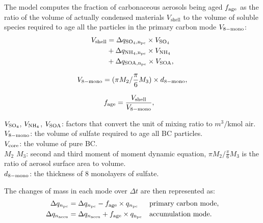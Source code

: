 \documentclass[12pt, fullpage]{uiucthesis2009}
\begin{document}
	The model computes the fraction of carbonaceous aerosols being aged $f_{\rm{age}}$ as the ratio of the volume of actually condensed materials $V_\text{shell}$ to the volume of soluble species required to age all the particles in the primary carbon mode $V_{\rm{8-mono}}$:
	\begin{align}
	\begin{split}
	V_{\rm{shell}} &=  \Delta q_{\rm{SO_4}, n_{\rm{pc}}} \times V_{\rm{SO_4}} \\
	&+ \Delta q_{\rm{NH_4}, n_{\rm{pc}}} \times V_{\rm{NH_4}} \\
	&+ \Delta q_{\rm{SOA}, n_{\rm{pc}}} \times V_{\rm{SOA}}, 
	\end{split}
	\end{align}
	
	\begin{align}
	\begin{split}
	V_{\rm{8-mono}} = (\pi M_2/ \frac{\pi}{6}M_3) \times d_{\rm{8-mono}},
	\end{split}
	\end{align}
	
	\begin{align}
	f_{\rm{age}} &= \frac{V_{\rm{shell}}}{V_{\rm{8-mono}}},  
	\end{align}
	
	\begin{flushleft}
		$V_{\rm{SO_4}}$, $V_{\rm{NH_4}}$, $V_{\rm{SOA}}$: factors that convert the unit of mixing ratio to $m^3/$kmol air. \\
		$V_{\rm{8-mono}}$: the volume of sulfate required to age all BC particles. \\
		$V_{\rm{core}}$: the volume of pure BC. \\
		$M_2$ $M_3$: second and third moment of  moment dynamic equation, $\pi M_2/ \frac{\pi}{6}M_3$ is the ratio of aerosol surface area to volume. \\
		$d_{\rm{8-mono}}$: the thickness of 8 monolayers of sulfate.
	\end{flushleft}
	
	The changes of mass in each mode over $\Delta t$ are then represented as:
	\begin{align}
	\Delta q_{n_{\rm{pc}}} &= \Delta q_{n_{\rm{pc}}} - f_{\rm{age}} \times q_{n_{\rm{pc}}}  &&\text{primary carbon mode}, \\
	\Delta q_{n_{\rm{accu}}} &= \Delta q_{n_{\rm{accu}}} + f_{\rm{age}} \times q_{\rm{n_{\rm{pc}}}}  &&\text{accumulation mode}.
	\end{align}
	
\end{document}

